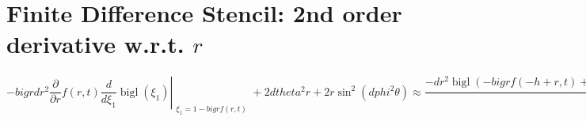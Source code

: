 \documentclass{article}
\begin{document}
\section*{Finite Difference Stencil: 2nd order derivative w.r.t. $r$}


\[
- bigr dr^{2} \frac{\partial}{\partial r} f{\left(r,t \right)} \left. \frac{d}{d \xi_{1}} \operatorname{bigl}{\left(\xi_{1} \right)} \right|_{\substack{ \xi_{1}=1 - bigr f{\left(r,t \right)} }} + 2 dtheta^{2} r + 2 r \sin^{2}{\left(dphi^{2} \theta \right)} \approx \frac{- dr^{2} \operatorname{bigl}{\left(- bigr f{\left(- h + r,t \right)} + 1 \right)} + dr^{2} \operatorname{bigl}{\left(- bigr f{\left(h + r,t \right)} + 1 \right)} + 4 dtheta^{2} h r + 4 h r \sin^{2}{\left(dphi^{2} \theta \right)}}{2 h} \quad (O(h^2))
\]
\end{document}
